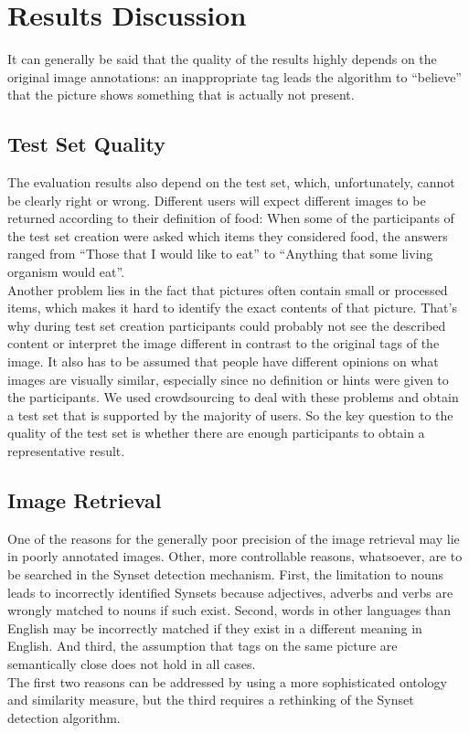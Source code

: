 %
\section{Results Discussion}
\label{sec_discussion}

It can generally be said that the quality of the results highly depends on the original image annotations: an inappropriate tag leads the algorithm to ``believe'' that the picture shows something that is actually not present.

\subsection{Test Set Quality}
The evaluation results also depend on the test set, which, unfortunately, cannot be clearly right or wrong. Different users will expect different images to be returned according to their definition of food: When some of the participants of the test set creation were asked which items they considered food, the answers ranged from ``Those that I would like to eat'' to ``Anything that some living organism would eat''. \\
Another problem lies in the fact that pictures often contain small or processed items, which makes it hard to identify the exact contents of that picture. That's why during test set creation participants could probably not see the described content or interpret the image different in contrast to the original tags of the image. 
It also has to be assumed that people have different opinions on what images are visually similar, especially since no definition or hints were given to the participants. We used crowdsourcing to deal with these problems and obtain a test set that is supported by the majority of users. So the key question to the quality of the test set is whether there are enough participants to obtain a representative result.

\subsection{Image Retrieval}
One of the reasons for the generally poor precision of the image retrieval may lie in poorly annotated images.
Other, more controllable reasons, whatsoever, are to be searched in the Synset detection mechanism. First, the limitation to nouns leads to incorrectly identified Synsets because adjectives, adverbs and verbs are wrongly matched to nouns if such exist. 
Second, words in other languages than English may be incorrectly matched if they exist in a different meaning in English.
And third, the assumption that tags on the same picture are semantically close does not hold in all cases. \\
The first two reasons can be addressed by using a more sophisticated ontology and similarity measure, but the third requires a rethinking of the Synset detection algorithm.

